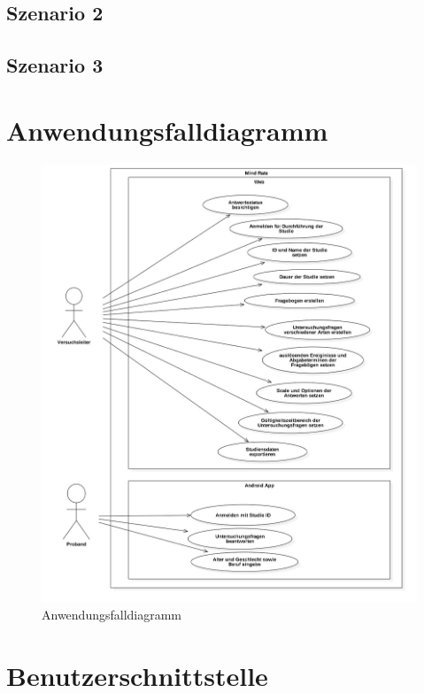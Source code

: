 \documentclass[a4paper]{scrreprt}
\begin{document}
            \subsection{Szenario 2}
            \subsection{Szenario 3}

        \newpage
        \section{Anwendungsfalldiagramm}
            \vspace*{2cm}
            \begin{figure}[htbp]
                \centering
                \includegraphics[scale = 0.4]{UseCaseDiagram1.jpg}
                \caption{Anwendungsfalldiagramm}
            \end{figure}

        \newpage
        \section{Benutzerschnittstelle}
\end{document}
